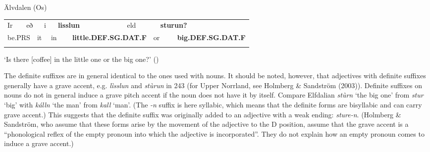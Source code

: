 \begin{listWWNumileveli}
\item {}

\begin{styleExample}
\label{bkm:Ref78439135}Älvdalen (Os)

\end{styleExample}

\end{listWWNumileveli}

\begin{tabular}{llllllllllll}
\lsptoprule
Ir & \multicolumn{2}{l}{eð

} & \multicolumn{2}{l}{i

} & \multicolumn{2}{l}{{\bfseries lisslun}

} & \multicolumn{2}{l}{eld

} & \multicolumn{2}{l}{{\bfseries sturun?}

} & \\
\multicolumn{2}{l}{be.PRS

} & \multicolumn{2}{l}{it

} & \multicolumn{2}{l}{in

} & \multicolumn{2}{l}{{\bfseries little.DEF.SG.DAT.F}

} & \multicolumn{2}{l}{or

} & \multicolumn{2}{l}{{\bfseries big.DEF.SG.DAT.F}

}\\
\lspbottomrule
\end{tabular}

\begin{styleTranslation}
‘Is there [coffee] in the little one or the big one?’ (\citet[53]{Levander1909})

\end{styleTranslation}

\begin{styleBodyTextFirst}
The definite suffixes are in general identical to the ones used with nouns. It should be noted, however, that adjectives with definite suffixes generally have a grave accent, e.g. \textit{lìsslun} and \textit{stùrun} in 243 (for Upper Norrland, see Holmberg \& Sandström (2003)). Definite suffixes on nouns do not in general induce a grave pitch accent if the noun does not have it by itself. Compare Elfdalian \textit{stùrn} ‘the big one’ from \textit{stur} ‘big’ with \textit{kálln} ‘the man’ from \textit{kall} ‘man’. (The\textit{ -}\textit{n} suffix is here syllabic, which means that the definite forms are bisyllabic and can carry grave accent.) This suggests that the definite suffix was originally added to an adjective with a weak ending: \textit{sture-n}. (Holmberg \& Sandström, who assume that these forms arise by the movement of the adjective to the D position, assume that the grave accent is a “phonological reflex of the empty pronoun into which the adjective is incorporated”. They do not explain how an empty pronoun comes to induce a grave accent.) 

\end{styleBodyTextFirst}

